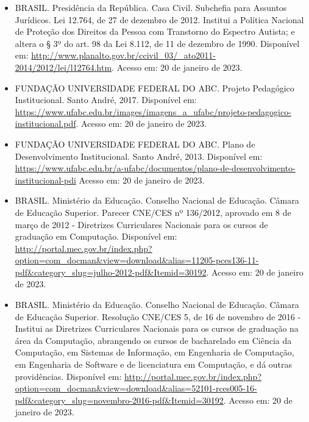 \begin{itemize}
    \item BRASIL. Presidência da República. Casa Civil. Subchefia para Assuntos
    Jurídicos. Lei 12.764, de 27 de dezembro de 2012. Institui a Política
    Nacional de Proteção dos Direitos da Pessoa com Transtorno do Espectro
    Autista; e altera o § 3º do art. 98 da Lei 8.112, de 11 de dezembro de
    1990. 
    Disponível em: \url{http://www.planalto.gov.br/ccivil_03/_ato2011-2014/2012/lei/l12764.htm}.
    Acesso em: 20 de janeiro de 2023.
    
    \item FUNDAÇÃO UNIVERSIDADE FEDERAL DO ABC. Projeto Pedagógico Institucional. Santo
    André, 2017. Disponível em:
    \url{https://www.ufabc.edu.br/images/imagens_a_ufabc/projeto-pedagogico-institucional.pdf}.
    Acesso em: 20 de janeiro de 2023.
    
    \item FUNDAÇÃO UNIVERSIDADE FEDERAL DO ABC. Plano de Desenvolvimento
    Institucional. Santo André, 2013. Disponível em:
    \url{https://www.ufabc.edu.br/a-ufabc/documentos/plano-de-desenvolvimento-institucional-pdi}
    Acesso em: 20 de janeiro de 2023.
    
    \item BRASIL. Ministério da Educação. Conselho Nacional de Educação. Câmara
    de Educação Superior. Parecer CNE/CES nº 136/2012, aprovado em 8 de março
    de 2012 - Diretrizes Curriculares Nacionais para os cursos de graduação em
    Computação. 
    Disponível em: \url{http://portal.mec.gov.br/index.php?option=com_docman&view=download&alias=11205-pces136-11-pdf&category_slug=julho-2012-pdf&Itemid=30192}.
    Acesso em: 20 de janeiro de 2023.
    
    \item BRASIL. Ministério da Educação. Conselho Nacional de Educação. Câmara
    de Educação Superior. Resolução CNE/CES 5, de 16 de novembro de 2016 -
    Institui as Diretrizes Curriculares Nacionais para os cursos de graduação
    na área da Computação, abrangendo os cursos de bacharelado em Ciência da
    Computação, em Sistemas de Informação, em Engenharia de Computação, em
    Engenharia de Software e de licenciatura em Computação, e dá outras
    providências. Disponível em:
    \url{http://portal.mec.gov.br/index.php?option=com_docman&view=download&alias=52101-rces005-16-pdf&category_slug=novembro-2016-pdf&Itemid=30192}.
    Acesso em: 20 de janeiro de 2023.
    
\end{itemize}


